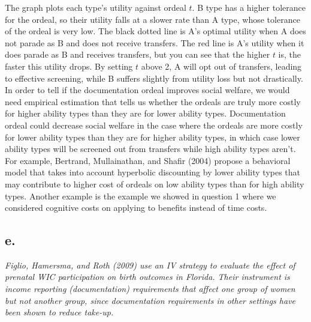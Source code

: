 \documentclass[
]{article}
\begin{document}
The graph plots each type's utility against ordeal \(t\). B type has a
higher tolerance for the ordeal, so their utility falls at a slower rate
than A type, whose tolerance of the ordeal is very low. The black dotted
line is A's optimal utility when A does not parade as B and does not
receive transfers. The red line is A's utility when it does parade as B
and receives transfers, but you can see that the higher \(t\) is, the
faster this utility drops. By setting \(t\) above 2, A will opt out of
transfers, leading to effective screening, while B suffers slightly from
utility loss but not drastically.\\
In order to tell if the documentation ordeal improves social welfare, we
would need empirical estimation that tells us whether the ordeals are
truly more costly for higher ability types than they are for lower
ability types. Documentation ordeal could decrease social welfare in the
case where the ordeals are more costly for lower ability types than they
are for higher ability types, in which case lower ability types will be
screened out from transfers while high ability types aren't. For
example, Bertrand, Mullainathan, and Shafir (2004) propose a behavioral
model that takes into account hyperbolic discounting by lower ability
types that may contribute to higher cost of ordeals on low ability types
than for high ability types. Another example is the example we showed in
question 1 where we considered cognitive costs on applying to benefits
instead of time costs.

\hypertarget{e.-1}{%
\subsection{e.}\label{e.-1}}

\textit{Figlio, Hamersma, and Roth (2009) use an IV strategy to evaluate the effect of prenatal WIC participation on birth outcomes in Florida. Their instrument is income reporting (documentation) requirements that affect one group of women but not another group, since documentation requirements in other settings have been shown to reduce take-up.}
\end{document}
